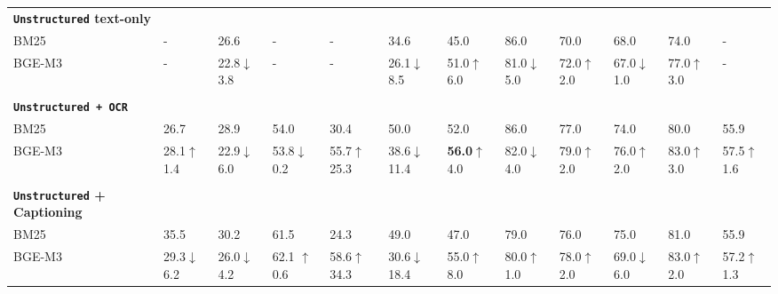 \documentclass{article} %
\newcommand{\code}[1]{\texttt{#1}}
\begin{document}
\begin{table}[ht]
{\begin{tabular}{ll@{\hskip 0.5em}l@{\hskip 0.5em}l@{\hskip 0.5em}l@{\hskip 0.5em}l@{\hskip 0.5em}l@{\hskip 0.5em}l@{\hskip 0.5em}l@{\hskip 0.5em}l@{\hskip 0.5em}l|@{\hskip 0.5em}l}
    \midrule
    \multicolumn{0}{l}{\textbf{\code{Unstructured} \tiny text-only}}\\%
    BM25 & - & 26.6 & - & - & 34.6 & 45.0 & 86.0 & 70.0 & 68.0 & 74.0 & -  \\
    BGE-M3 & - & 22.8\textcolor{red!75!black}{\tiny $\downarrow$3.8} & - & - & 26.1\textcolor{red!75!black}{\tiny $\downarrow$8.5} & 51.0\textcolor{green!75!black}{\tiny $\uparrow$6.0} & 81.0\textcolor{red!75!black}{\tiny $\downarrow$5.0} & 72.0\textcolor{green!75!black}{\tiny $\uparrow$2.0} & 67.0\textcolor{red!75!black}{\tiny $\downarrow$1.0} & 77.0\textcolor{green!75!black}{\tiny $\uparrow$3.0} & -  \\
    \\
    \multicolumn{0}{l}{\textbf{\code{Unstructured \tiny+ OCR}}}\\
    BM25 & 26.7 & 28.9 & 54.0 & 30.4 & 50.0 & 52.0 & 86.0 & 77.0 & 74.0 & 80.0 & 55.9\\
    BGE-M3 & 
    28.1\textcolor{green!75!black}{\tiny $\uparrow$1.4} & 
    22.9\textcolor{red!75!black}{\tiny $\downarrow$6.0} & 53.8\textcolor{red!75!black}{\tiny $\downarrow$0.2} & 
    55.7\textcolor{green!75!black}{\tiny $\uparrow$25.3} & 
    38.6\textcolor{red!75!black}{\tiny $\downarrow$11.4} & 
    \textbf{56.0}\textcolor{green!75!black}{\tiny $\uparrow$4.0} & 82.0\textcolor{red!75!black}{\tiny $\downarrow$4.0} & 79.0\textcolor{green!75!black}{\tiny $\uparrow$2.0} & 
    76.0\textcolor{green!75!black}{\tiny $\uparrow$2.0} & 
    83.0\textcolor{green!75!black}{\tiny $\uparrow$3.0} & 
    57.5\textcolor{green!75!black}{\tiny $\uparrow$1.6}\\
    \\
    \multicolumn{0}{l}{\textbf{\code{Unstructured} \tiny+ Captioning}}\\
    BM25 & 35.5 & 30.2 & 61.5 & 24.3 & 49.0 & 47.0 & 79.0 & 76.0 & 75.0 & 81.0 & 55.9\\
    
    BGE-M3 & 
    29.3\textcolor{red!75!black}{\tiny $\downarrow$6.2} & 
    26.0\textcolor{red!75!black}{\tiny $\downarrow$4.2} & 
    62.1 \textcolor{green!75!black}{\tiny $\uparrow$0.6}& 
    58.6\textcolor{green!75!black}{\tiny $\uparrow$34.3} & 
    30.6\textcolor{red!75!black}{\tiny $\downarrow$18.4} & 
    55.0\textcolor{green!75!black}{\tiny $\uparrow$8.0} & 80.0\textcolor{green!75!black}{\tiny $\uparrow$1.0} & 
    78.0\textcolor{green!75!black}{\tiny $\uparrow$2.0} & 
    69.0\textcolor{red!75!black}{\tiny $\downarrow$6.0} & 
    83.0\textcolor{green!75!black}{\tiny $\uparrow$2.0} & 
    57.2\textcolor{green!75!black}{\tiny $\uparrow$1.3} \\
    \midrule


\end{tabular}}
\end{table}
\end{document}
